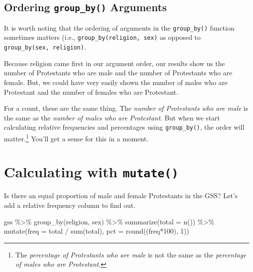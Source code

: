 \documentclass[
  letterpaper,
]{book}
\newenvironment{Shaded}{\begin{snugshade}}{\end{snugshade}}
\newcommand{\AttributeTok}[1]{\textcolor[rgb]{0.40,0.45,0.13}{#1}}
\newcommand{\DecValTok}[1]{\textcolor[rgb]{0.68,0.00,0.00}{#1}}
\newcommand{\FunctionTok}[1]{\textcolor[rgb]{0.28,0.35,0.67}{#1}}
\newcommand{\NormalTok}[1]{\textcolor[rgb]{0.00,0.23,0.31}{#1}}
\newcommand{\SpecialCharTok}[1]{\textcolor[rgb]{0.37,0.37,0.37}{#1}}
\begin{document}
\hypertarget{ordering-group_by-arguments}{%
\subsection{\texorpdfstring{Ordering \texttt{group\_by()}
Arguments}{Ordering group\_by() Arguments}}\label{ordering-group_by-arguments}}

It is worth noting that the ordering of arguments in the
\texttt{group\_by()} function sometimes matters (i.e.,
\texttt{group\_by(religion,\ sex)} as opposed to
\texttt{group\_by(sex,\ religion)}.

Because religion came first in our argument order, our results show us
the number of Protestants who are male and the number of Protestants who
are female. But, we could have very easily shown the number of males who
are Protestant and the number of females who are Protestant.

For a count, these are the same thing. The \emph{number of Protestants
who are male} is the same as the \emph{number of males who are
Protestant}. But when we start calculating relative frequencies and
percentages using \texttt{group\_by()}, the order will
matter.\footnote{The \emph{percentage of} \emph{Protestants who are
  male} is not the same as the \emph{percentage of males who are
  Protestant}.} You'll get a sense for this in a moment.

\hypertarget{calculating-with-mutate}{%
\section{\texorpdfstring{Calculating with
\texttt{mutate()}}{Calculating with mutate()}}\label{calculating-with-mutate}}

Is there an equal proportion of male and female Protestants in the GSS?
Let's add a relative frequency column to find out.

\begin{Shaded}
\begin{Highlighting}[]
\NormalTok{gss }\SpecialCharTok{\%\textgreater{}\%}
  \FunctionTok{group\_by}\NormalTok{(religion, sex) }\SpecialCharTok{\%\textgreater{}\%}
  \FunctionTok{summarize}\NormalTok{(}\AttributeTok{total =} \FunctionTok{n}\NormalTok{()) }\SpecialCharTok{\%\textgreater{}\%}
  \FunctionTok{mutate}\NormalTok{(}\AttributeTok{freq =}\NormalTok{ total }\SpecialCharTok{/} \FunctionTok{sum}\NormalTok{(total),}
         \AttributeTok{pct =} \FunctionTok{round}\NormalTok{((freq}\SpecialCharTok{*}\DecValTok{100}\NormalTok{), }\DecValTok{1}\NormalTok{))}
\end{Highlighting}
\end{Shaded}
\end{document}
